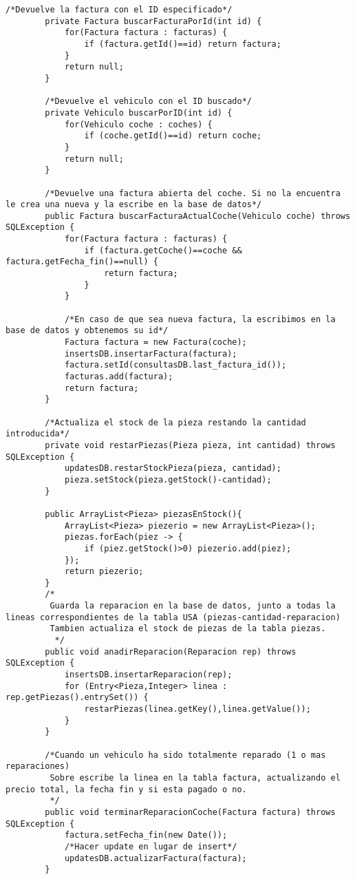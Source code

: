 \begin{lstlisting}[caption=GestorOperaciones.java (App Escritorio)]
        /*Devuelve la factura con el ID especificado*/
        private Factura buscarFacturaPorId(int id) {
            for(Factura factura : facturas) {
                if (factura.getId()==id) return factura;
            }
            return null;
        }
        
        /*Devuelve el vehiculo con el ID buscado*/
        private Vehiculo buscarPorID(int id) {
            for(Vehiculo coche : coches) {
                if (coche.getId()==id) return coche;
            }
            return null;
        }
        
        /*Devuelve una factura abierta del coche. Si no la encuentra le crea una nueva y la escribe en la base de datos*/
        public Factura buscarFacturaActualCoche(Vehiculo coche) throws SQLException {
            for(Factura factura : facturas) {
                if (factura.getCoche()==coche && factura.getFecha_fin()==null) {
                    return factura;
                }
            }
            
            /*En caso de que sea nueva factura, la escribimos en la base de datos y obtenemos su id*/
            Factura factura = new Factura(coche);
            insertsDB.insertarFactura(factura);
            factura.setId(consultasDB.last_factura_id());
            facturas.add(factura);
            return factura;
        }
    
        /*Actualiza el stock de la pieza restando la cantidad introducida*/
        private void restarPiezas(Pieza pieza, int cantidad) throws SQLException {
            updatesDB.restarStockPieza(pieza, cantidad);
            pieza.setStock(pieza.getStock()-cantidad);
        }
        
        public ArrayList<Pieza> piezasEnStock(){
            ArrayList<Pieza> piezerio = new ArrayList<Pieza>();
            piezas.forEach(piez -> {
                if (piez.getStock()>0) piezerio.add(piez);
            });
            return piezerio;
        }
        /*
         Guarda la reparacion en la base de datos, junto a todas la lineas correspondientes de la tabla USA (piezas-cantidad-reparacion)
         Tambien actualiza el stock de piezas de la tabla piezas.
          */
        public void anadirReparacion(Reparacion rep) throws SQLException {
            insertsDB.insertarReparacion(rep);
            for (Entry<Pieza,Integer> linea : rep.getPiezas().entrySet()) {
                restarPiezas(linea.getKey(),linea.getValue());
            }
        }
        
        /*Cuando un vehiculo ha sido totalmente reparado (1 o mas reparaciones)
         Sobre escribe la linea en la tabla factura, actualizando el precio total, la fecha fin y si esta pagado o no. 
         */
        public void terminarReparacionCoche(Factura factura) throws SQLException {
            factura.setFecha_fin(new Date());
            /*Hacer update en lugar de insert*/
            updatesDB.actualizarFactura(factura);
        }
        

\end{lstlisting}
